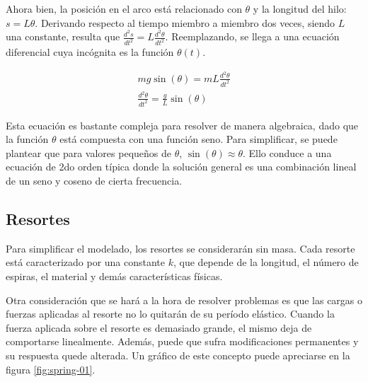 \documentclass{article}
\begin{document}
Ahora bien, la posición en el arco está relacionado con $\theta$ y la longitud del hilo: $s = L \theta$. Derivando respecto al tiempo miembro a miembro dos veces, siendo $L$ una constante, resulta que $\frac{d^2s}{dt^2} = L \frac{d^2\theta}{dt^2}$. Reemplazando, se llega a una ecuación diferencial cuya incógnita es la función $\theta(t)$.

\begin{subequations}
\begin{align}
mg \sin(\theta) = m L \frac{d^2\theta}{dt^2} \\
\frac{d^2\theta}{dt^2} = \frac{g}{L} \sin(\theta)
\end{align}
\end{subequations}

Esta ecuación es bastante compleja para resolver de manera algebraica, dado que la función $\theta$ está compuesta con una función seno. Para simplificar, se puede plantear que para valores pequeños de $\theta$, $\sin(\theta) \approx \theta$. Ello conduce a una ecuación de 2do orden típica donde la solución general es una combinación lineal de un seno y coseno de cierta frecuencia.

\subsection{Resortes}

Para simplificar el modelado, los resortes se considerarán sin masa. Cada resorte está caracterizado por una constante $k$, que depende de la longitud, el número de espiras, el material y demás características físicas.

Otra consideración que se hará a la hora de resolver problemas es que las cargas o fuerzas aplicadas al resorte no lo quitarán de su período elástico. Cuando la fuerza aplicada sobre el resorte es demasiado grande, el mismo deja de comportarse linealmente. Además, puede que sufra modificaciones permanentes y su respuesta quede alterada. Un gráfico de este concepto puede apreciarse en la figura \ref{fig:spring-01}.
\end{document}
